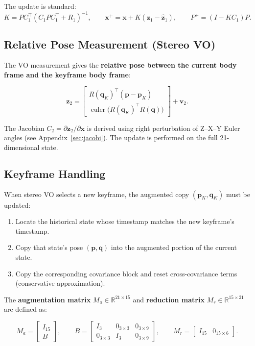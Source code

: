 \documentclass[11pt,a4paper]{article}
\begin{document}
The update is standard:
\[
K = P C_1^\top (C_1 P C_1^\top + R_1)^{-1},
\qquad
\mathbf{x}^+ = \mathbf{x} + K (\mathbf{z}_1 - \hat{\mathbf{z}}_1),
\qquad
P^+ = (I - K C_1) P.
\]

\subsection{Relative Pose Measurement (Stereo VO)}
\label{sec:vo}

The VO measurement gives the \textbf{relative pose between the current body frame and the keyframe body frame}:

\[
\mathbf{z}_2 = \begin{bmatrix}
R(\mathbf{q}_K)^\top (\mathbf{p} - \mathbf{p}_K) \\
\operatorname{euler}\!\big(R(\mathbf{q}_K)^\top R(\mathbf{q})\big)
\end{bmatrix} + \mathbf{v}_2.
\]

The Jacobian \(C_2 = \partial \mathbf{z}_2 / \partial \mathbf{x}\) is derived using right perturbation of Z--X--Y Euler angles (see Appendix~\ref{sec:jacobi}). The update is performed on the full 21-dimensional state.

\subsection{Keyframe Handling}
\label{sec:keyframe}

When stereo VO selects a new keyframe, the augmented copy \((\mathbf{p}_K, \mathbf{q}_K)\) must be updated:

\begin{enumerate}
  \item Locate the historical state whose timestamp matches the new keyframe's timestamp.
  \item Copy that state's pose \((\mathbf{p}, \mathbf{q})\) into the augmented portion of the current state.
  \item Copy the corresponding covariance block and reset cross-covariance terms (conservative approximation).
\end{enumerate}

The \textbf{augmentation matrix} \(M_a \in \mathbb{R}^{21 \times 15}\) and \textbf{reduction matrix} \(M_r \in \mathbb{R}^{15 \times 21}\) are defined as:

\[
M_a = \begin{bmatrix} I_{15} \\ B \end{bmatrix},\qquad
B = \begin{bmatrix} I_3 & 0_{3\times3} & 0_{3\times9} \\
                    0_{3\times3} & I_3 & 0_{3\times9} \end{bmatrix},\qquad
M_r = \begin{bmatrix} I_{15} & 0_{15\times6} \end{bmatrix}.
\]
\end{document}
